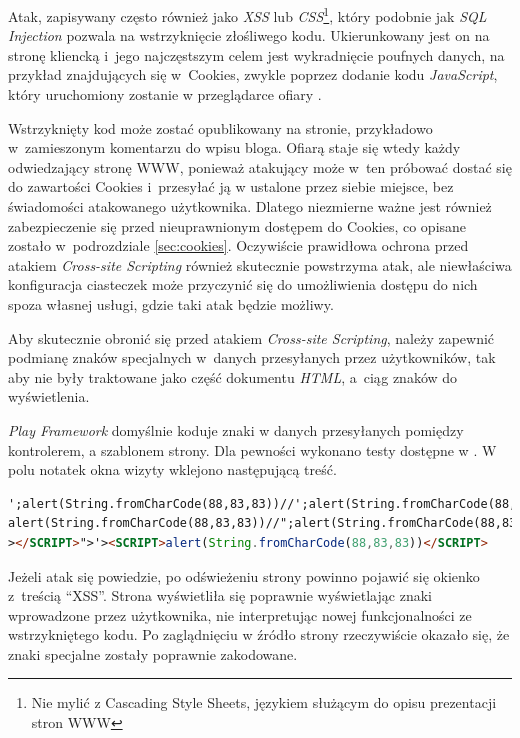 \documentclass[11pt]{aghdpl}
\begin{document}
Atak, zapisywany często również jako \emph{XSS} lub \emph{CSS}\footnote{Nie mylić z Cascading Style Sheets, językiem służącym do opisu prezentacji stron WWW}, który podobnie jak \emph{SQL Injection} pozwala na wstrzyknięcie złośliwego kodu. Ukierunkowany jest on na stronę kliencką i~jego najczęstszym celem jest wykradnięcie poufnych danych, na przykład znajdujących się w~Cookies, zwykle poprzez dodanie kodu \emph{JavaScript}, który uruchomiony zostanie w przeglądarce ofiary \cite{XSSE}.

Wstrzyknięty kod może zostać opublikowany na stronie, przykładowo w~zamieszonym komentarzu do wpisu bloga. Ofiarą staje się wtedy każdy odwiedzający stronę WWW, ponieważ atakujący może w~ten próbować dostać się do zawartości Cookies i~przesyłać ją w ustalone przez siebie miejsce, bez świadomości atakowanego użytkownika. Dlatego niezmierne ważne jest również zabezpieczenie się przed nieuprawnionym dostępem do Cookies, co opisane zostało w~podrozdziale \ref{sec:cookies}. Oczywiście prawidłowa ochrona przed atakiem \emph{Cross-site Scripting} również skutecznie powstrzyma atak, ale niewłaściwa konfiguracja ciasteczek może przyczynić się do umożliwienia dostępu do nich spoza własnej usługi, gdzie taki atak będzie możliwy.

Aby skutecznie obronić się przed atakiem \emph{Cross-site Scripting}, należy zapewnić podmianę znaków specjalnych w~danych przesyłanych przez użytkowników, tak aby nie były traktowane jako część dokumentu \emph{HTML}, a~ciąg znaków do wyświetlenia.

\emph{Play Framework} domyślnie koduje znaki w danych przesyłanych pomiędzy kontrolerem, a szablonem strony. Dla pewności wykonano testy dostępne w \cite{XSST}. W polu notatek okna wizyty wklejono następującą treść.

\begin{lstlisting}[language=HTML]
';alert(String.fromCharCode(88,83,83))//';alert(String.fromCharCode(88,83,83))//";
alert(String.fromCharCode(88,83,83))//";alert(String.fromCharCode(88,83,83))//--
></SCRIPT>">'><SCRIPT>alert(String.fromCharCode(88,83,83))</SCRIPT>
\end{lstlisting}

Jeżeli atak się powiedzie, po odświeżeniu strony powinno pojawić się okienko z~treścią ``XSS''. Strona wyświetliła się poprawnie wyświetlając znaki wprowadzone przez użytkownika, nie interpretując nowej funkcjonalności ze wstrzykniętego kodu. Po zaglądnięciu w źródło strony rzeczywiście okazało się, że znaki specjalne zostały poprawnie zakodowane.
\end{document}

